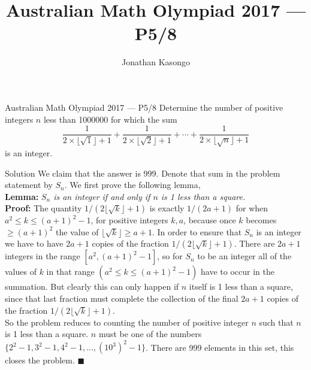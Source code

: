 \documentclass{article}
\author{Jonathan Kasongo}
\title{Australian Math Olympiad 2017 --- P5/8}
\begin{document}
\maketitle

\begin{problem}{Australian Math Olympiad 2017 --- P5/8}
Determine the number of positive integers $n$ less than 1000000 for which the sum
$$
\frac{1}{2 \times\lfloor\sqrt{1}\rfloor+1}+\frac{1}{2 \times\lfloor\sqrt{2}\rfloor+1}+\cdots+\frac{1}{2 \times\lfloor\sqrt{n}\rfloor+1}
$$
is an integer.
\end{problem}

\begin{solution}{Solution}
We claim that the answer is $999$. Denote that sum in the problem
statement by $S_n$. We first prove the following lemma,\\

{\sffamily \bfseries Lemma:}
\textit{$S_n$ is an integer if and only if $n$ is 1 less than a square.}\\

{\sffamily \bfseries Proof:}
The quantity $1/(2 \lfloor \sqrt{k} \rfloor + 1)$ is exactly $1/(2a+1)$
for when $a^2 \leq k \leq (a + 1)^2 - 1$, for positive integers $k, a$,
because once $k$ becomes $\geq (a + 1)^2$ the value of
$\lfloor \sqrt{k} \rfloor \geq a+1$. In order to ensure that $S_n$ is an
integer we have to have $2a + 1$ copies of the fraction
$1/(2 \lfloor \sqrt{k} \rfloor + 1)$. There are
$2a + 1$ integers in the range $[a^2, (a+1)^2 - 1]$, so for $S_n$ to be
an integer all of the values of $k$ in that range
$(a^2 \leq k \leq (a+1)^2 -1)$ have to occur in the summation. But clearly
this can only happen if $n$ itself is 1 less than a square, since that last
fraction must complete the collection of the final $2a + 1$ copies of the
fraction $1/(2 \lfloor \sqrt{k} \rfloor + 1)$.\\

So the problem reduces to counting the number of positive integer $n$ such
that $n$ is 1 less than a square. $n$ must be one of the numbers
$\{2^2-1, 3^2-1, 4^2-1,..., (10^3)^2 -1\}$. There are 999 elements in this
set, this closes the problem. $\blacksquare$
\end{solution}
\end{document}
